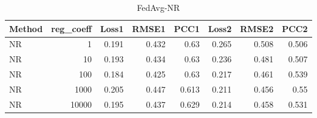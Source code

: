 \begin{table}
\caption{FedAvg-NR}
\begin{tabular}{lrrrrrrr}
\toprule
Method & reg_coeff & Loss1 & RMSE1 & PCC1 & Loss2 & RMSE2 & PCC2 \\
\midrule
NR & 1 & 0.191 & 0.432 & 0.63 & 0.265 & 0.508 & 0.506 \\
NR & 10 & 0.193 & 0.434 & 0.63 & 0.236 & 0.481 & 0.507 \\
NR & 100 & 0.184 & 0.425 & 0.63 & 0.217 & 0.461 & 0.539 \\
NR & 1000 & 0.205 & 0.447 & 0.613 & 0.211 & 0.456 & 0.55 \\
NR & 10000 & 0.195 & 0.437 & 0.629 & 0.214 & 0.458 & 0.531 \\
\bottomrule
\end{tabular}
\end{table}
